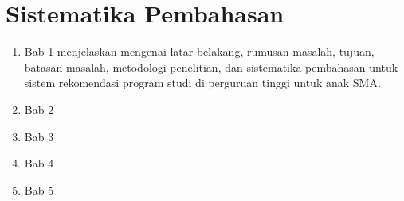 
\section{Sistematika Pembahasan}
\label{sec:sispem}
\begin{enumerate}
	\item Bab 1 menjelaskan mengenai latar belakang, rumusan masalah, tujuan, batasan masalah, metodologi penelitian, dan sistematika pembahasan untuk sistem rekomendasi program studi di perguruan tinggi untuk anak SMA.
	\item Bab 2 
	\item Bab 3
	\item Bab 4
	\item Bab 5
\end{enumerate}
